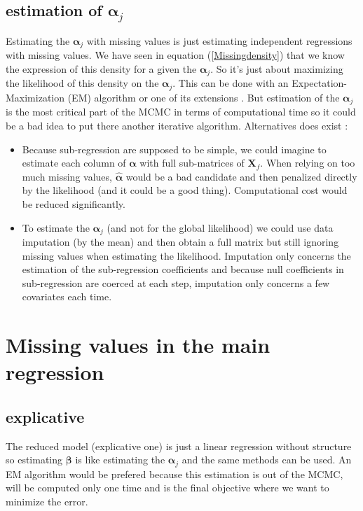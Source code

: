 \documentclass[11pt,a4paper]{report}
\begin{document}
		\subsection{estimation of $\boldsymbol{\alpha}_j$}
			Estimating the $\boldsymbol{\alpha}_j$ with missing values is just estimating independent regressions with missing values. We have seen in equation (\ref{Missingdensity}) that we know the expression of this density for a given the $\boldsymbol{\alpha}_j$. So it's just about maximizing the likelihood of this density on the $\boldsymbol{\alpha}_j$. This can be done with an Expectation-Maximization (EM) algorithm \cite{dempster1977maximum} or one of its extensions \cite{mclachlan2007algorithm}.
			But estimation of the $\boldsymbol{\alpha}_j$ is the most critical part of the MCMC in terms of computational time so it could be a bad idea to put there another iterative algorithm. 
			Alternatives does exist :
			\begin{itemize}
				\item Because sub-regression are supposed to be simple, we could imagine to estimate each column of $\boldsymbol{\alpha}$ with full sub-matrices of $\boldsymbol{X}_f$. When relying on too much missing values, $\hat{\boldsymbol{\alpha}}$ would be a bad candidate and then penalized directly by the likelihood (and it could be a good thing). Computational cost would be reduced significantly.
				\item To estimate the $\boldsymbol{\alpha}_j$ (and not for the global likelihood) we could use data imputation (by the mean) and then obtain a full matrix but still ignoring missing values when estimating the likelihood. Imputation only concerns the estimation of the sub-regression coefficients and because null coefficients in sub-regression are coerced at each step, imputation only concerns a few covariates each time.
			\end{itemize}
	\section{Missing values in the main regression}
		\subsection{explicative}
			The reduced model (explicative one) is just a linear regression without structure so estimating $\boldsymbol{\beta}$ is like estimating the $\boldsymbol{\alpha}_j$ and the same methods can be used. An EM algorithm would be prefered because this estimation is out of the MCMC, will be computed only one time and is the final objective where we want to minimize the error.
\end{document}
